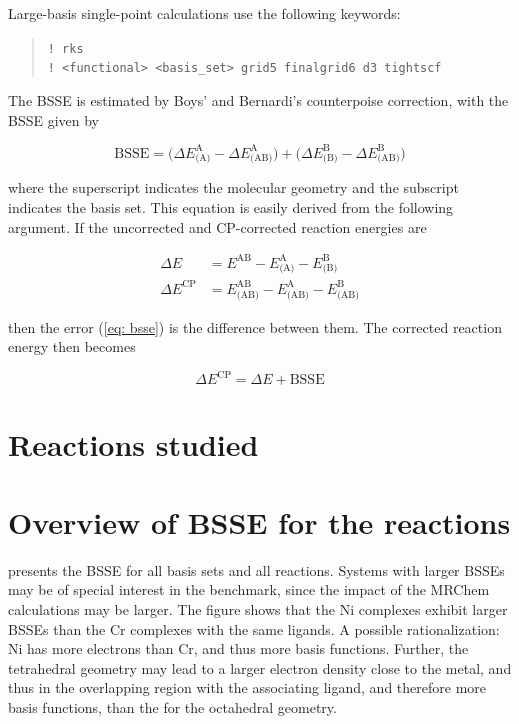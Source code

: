 \documentclass[11pt,a4paper]{article}
\begin{document}
Large-basis single-point calculations use the following keywords:

\begin{quote}
	\verb|! rks| \\
	\verb|! <functional> <basis_set> grid5 finalgrid6 d3 tightscf|
\end{quote}

The BSSE is estimated by Boys' and Bernardi's counterpoise correction, with the BSSE given by

\begin{equation} \label{eq: bsse}
\text{BSSE} = \Big(\Delta E^{\text{A}}_{\text{(A)}} - \Delta E^{\text{A}}_{\text{(AB)}} \Big) + \Big( \Delta E^{\text{B}}_{\text{(B)}} - \Delta E^{\text{B}}_{\text{(AB)}}\Big )
\end{equation}

where the superscript indicates the molecular geometry and the subscript indicates the basis set.
This equation is easily derived from the following argument.
If the uncorrected and CP-corrected reaction energies are

\begin{align} \label{eq: rxn uncorrected}
\Delta E &= E^{\text{AB}} - E^{\text{A}}_{\text{(A)}} - E^{\text{B}}_{\text{(B)}} \\ \label{eq: rxn corrected}
\Delta E^{\text{CP}} &= E^{\text{AB}}_{\text{(AB)}} - E^{\text{A}}_{\text{(AB)}} - E^{\text{B}}_{\text{(AB)}}
\end{align}

then the error (\cref{eq: bsse}) is the difference between them.
The corrected reaction energy then becomes

\begin{equation} \label{eq: }
\Delta E^{\text{CP}} = \Delta E + \text{BSSE}
\end{equation}

\section*{Reactions studied}

\section*{Overview of BSSE for the reactions}
 presents the BSSE for all basis sets and all reactions. 
Systems with larger BSSEs may be of special interest in the benchmark, since the impact of
the MRChem calculations may be larger.
The figure shows that the Ni complexes exhibit larger BSSEs than the Cr complexes with the same ligands.
A possible rationalization: Ni has more electrons than Cr, and thus more basis functions.
Further, the tetrahedral geometry may lead to a larger electron density close to the metal, and thus in the overlapping region with the associating ligand, and therefore more basis functions, than the for the octahedral geometry.
\end{document}
